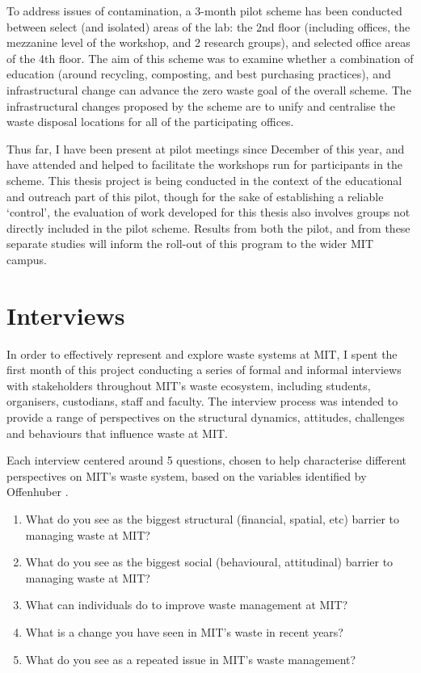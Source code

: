 \documentclass[nofonts,nols,justified,nobib]{tufte-book}
\begin{document}
To address issues of contamination, a 3-month pilot scheme has been conducted between select (and isolated) areas of the lab: the 2nd floor (including offices, the mezzanine level of the workshop, and 2 research groups), and selected office areas of the 4th floor. The aim of this scheme was to examine whether a combination of education (around recycling, composting, and best purchasing practices), and infrastructural change can advance the zero waste goal of the overall scheme. The infrastructural changes proposed by the scheme are to unify and centralise the waste disposal locations for all of the participating offices. 

Thus far, I have been present at pilot meetings since December of this year, and have attended and helped to facilitate the workshops run for participants in the scheme. This thesis project is being conducted in the context of the educational and outreach part of this pilot, though for the sake of establishing a reliable `control', the evaluation of work developed for this thesis also involves groups not directly included in the pilot scheme. Results from both the pilot, and from these separate studies will inform the roll-out of this program to the wider MIT campus. 

\section*{Interviews}

In order to effectively represent and explore waste systems at MIT, I spent the first month of this project conducting a series of formal and informal interviews with stakeholders throughout MIT's waste ecosystem, including students, organisers, custodians, staff and faculty. The interview process was intended to provide a range of perspectives on the structural dynamics, attitudes, challenges and behaviours that influence waste at MIT.

Each interview centered around 5 questions, chosen to help characterise different perspectives on MIT's waste system, based on the variables identified by Offenhuber \cite{offenhuber_waste_2017}.

\begin{enumerate}
\item What do you see as the biggest structural (financial, spatial, etc) barrier to managing waste at MIT?
\item What do you see as the biggest social (behavioural, attitudinal) barrier to managing waste at MIT?
\item What can individuals do to improve waste management at MIT?
\item What is a change you have seen in MIT's waste in recent years?
\item What do you see as a repeated issue in MIT's waste management?
\end{enumerate}
\end{document}
